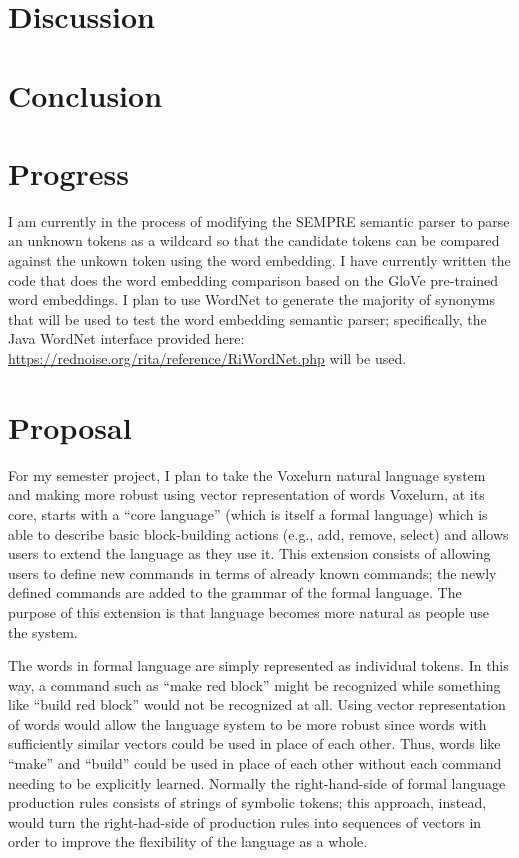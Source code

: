\documentclass[a4paper]{article}
\begin{document}
\section{Discussion}

\section{Conclusion}


\section{Progress}

I am currently in the process of modifying the SEMPRE semantic parser to 
parse an unknown tokens as a wildcard so that the candidate tokens can be
compared against the unkown token using the word embedding.
I have currently written the code that does the word embedding comparison based
on the GloVe pre-trained word embeddings.
I plan to use WordNet to generate the majority of synonyms that will be used to
test the word embedding semantic parser;
specifically, the Java WordNet interface provided here:
\url{https://rednoise.org/rita/reference/RiWordNet.php}
will be used.


\iffalse
\section{Proposal}

For my semester project, I plan to take the Voxelurn natural language system
and making more robust using vector representation of words
Voxelurn, at its core, starts with a ``core language'' (which is itself a formal
language) which is able to describe basic block-building actions
(e.g., add, remove, select) and allows users to extend the language as they use
it. This extension consists of allowing users to define new commands in terms
of already known commands; the newly defined commands are added to the grammar
of the formal language. The purpose of this extension is that language becomes
more natural as people use the system.

The words in formal language are simply represented as individual tokens.
In this way, a command such as ``make red block'' might be recognized while
something like ``build red block'' would not be recognized at all.
Using vector representation of words
would allow the language system to be more robust since words with
sufficiently similar vectors could be used in place of each other. Thus,
words like ``make'' and ``build'' could be used in place of each other
without each command needing to be explicitly learned.
Normally the right-hand-side of formal language production rules consists
of strings of symbolic tokens; this approach, instead, would turn the
right-had-side of production rules into sequences of vectors in order
to improve the flexibility of the language as a whole.
\end{document}
